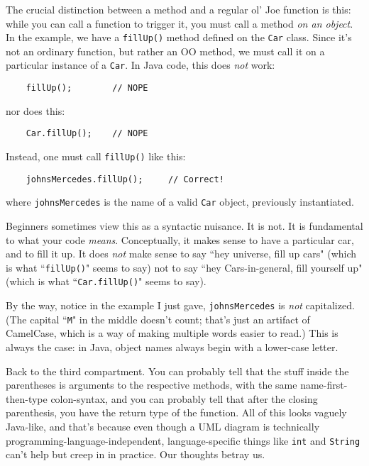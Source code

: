 The crucial distinction between a method and a regular ol' Joe function is
this: while you can call a function to trigger it, you must call a method
\textit{on an object}. In the example, we have a \texttt{fillUp()} method
defined on the \texttt{Car} class. Since it's not an ordinary function, but
rather an OO method, we must call it on a particular instance of a
\texttt{Car}. In Java code, this does \textit{not} work:

\begin{verbatim}
    fillUp();        // NOPE
\end{verbatim}

nor does this:

\begin{verbatim}
    Car.fillUp();    // NOPE
\end{verbatim}

Instead, one must call \texttt{fillUp()} like this:

\begin{verbatim}
    johnsMercedes.fillUp();     // Correct!
\end{verbatim}

where \texttt{johnsMercedes} is the name of a valid \texttt{Car} object,
previously instantiated.

Beginners sometimes view this as a syntactic nuisance. It is not. It is
fundamental to what your code \textit{means}. Conceptually, it makes sense to
have a particular car, and to fill it up. It does \textit{not} make sense to
say ``hey universe, fill up cars" (which is what ``\texttt{fillUp()}" seems to
say) not to say ``hey Cars-in-general, fill yourself up" (which is what
``\texttt{Car.fillUp()}" seems to say).

By the way, notice in the example I just gave, \texttt{johnsMercedes} is
\textit{not} capitalized. (The capital ``\texttt{M}" in the middle doesn't
count; that's just an artifact of CamelCase, which is a way of making multiple
words easier to read.) This is always the case: in Java, object names always
begin with a lower-case letter.

Back to the third compartment. You can probably tell that the stuff inside the
parentheses is arguments to the respective methods, with the same
name-first-then-type colon-syntax, and you can probably tell that after the
closing parenthesis, you have the return type of the function. All of this
looks vaguely Java-like, and that's because even though a UML diagram is
technically programming-language-independent, language-specific things like
\texttt{int} and \texttt{String} can't help but creep in in practice. Our
thoughts betray us.

